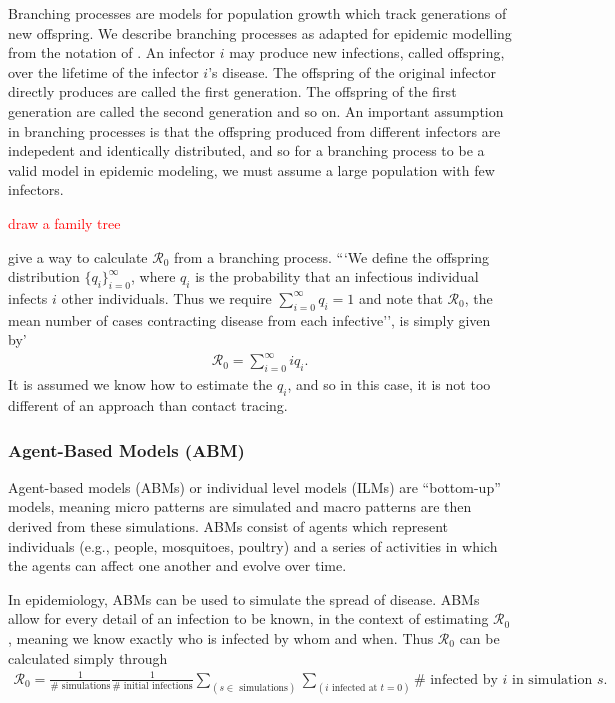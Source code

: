 \documentclass[12pt]{article}
\newcommand{\com}[1]{\textcolor{red}{ #1}}
\newcommand{\rr}{\ensuremath{\mathcal{R}_0}}
\begin{document}
Branching processes are models for population growth which track generations of new offspring.  We describe branching processes as adapted for epidemic modelling from the notation of \cite{grimmett1991}.  An infector $i$ may produce new infections, called offspring, over the lifetime of the  infector $i$'s disease.  The offspring of the original infector directly produces are called the first generation.  The offspring of the first generation are called the second generation and so on.  An important assumption in branching processes is that the offspring produced from different infectors are indepedent and identically distributed, and so for a branching process to be a valid model in epidemic modeling, we must assume a large population with few infectors.

\com{draw a family tree}

\cite{getz2006} give a way to calculate $\rr$ from a branching process.  ```We define the offspring distribution $\{q_i \}_{i=0}^\infty$, where $q_i$  is the probability that an infectious individual infects $i$ other individuals.  Thus we require $\sum_{i=0}^\infty q_i =1$ and note that $\rr$, the mean number of cases contracting disease from each infective'', is simply given by'
  \begin{align*}
    \rr = \sum_{i=0}^\infty iq_i.
  \end{align*}
  It is assumed we know how to estimate the $q_i$, and so in this case, it is not too different of an approach than contact tracing.


    

\subsubsection{Agent-Based Models (ABM)}
\label{sec:agent-based-models}
Agent-based models (ABMs) or individual level models (ILMs) are ``bottom-up'' models, meaning micro patterns are simulated and macro patterns are then derived from these simulations.  ABMs consist of agents which represent individuals (e.g., people, mosquitoes, poultry) and a series of activities in which the agents can affect one another and evolve over time.

In epidemiology, ABMs can be used to simulate the spread of disease.  ABMs allow for every detail of an infection to be known, in the context of estimating $\rr$, meaning we know exactly who is infected by whom and when.  Thus $\rr$ can be calculated simply through
\begin{align*}
  \rr = \frac{1}{\# \text{ simulations}}\frac{1}{\#\text{ initial infections}} \sum_{(s \in \text{ simulations})}\sum_{(i \text{ infected at } t=0)} \# \text{ infected by $i$ in simulation }s.
\end{align*}
\end{document}
